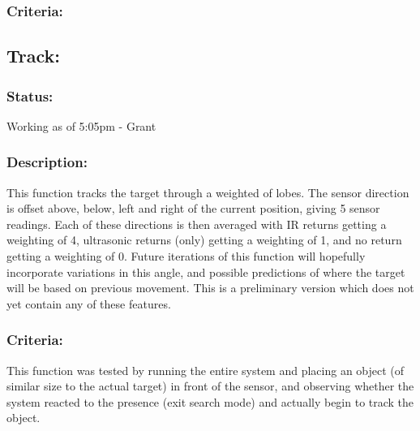 \documentclass[]{report}
\begin{document}
\subsubsection{Criteria:}


\subsection{Track:}
\subsubsection{Status:}
Working as of 5:05pm - Grant

\subsubsection{Description:}
This function tracks the target through a weighted of lobes. The sensor direction is offset above, below, left and right of the current position, giving 5 sensor readings. Each of these directions is then averaged with IR returns getting a weighting of 4, ultrasonic returns (only) getting a weighting of 1, and no return getting a weighting of 0. \newline
Future iterations of this function will hopefully incorporate variations in this angle, and possible predictions of where the target will be based on previous movement. This is a preliminary version which does not yet contain any of these features.

\subsubsection{Criteria:}
This function was tested by running the entire system and placing an object (of similar size to the actual target) in front of the sensor, and observing whether the system reacted to the presence (exit search mode) and actually begin to track the object.
\end{document}
